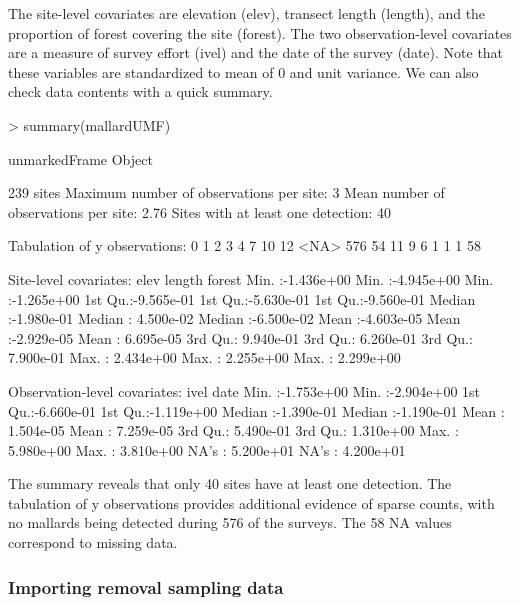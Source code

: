 \documentclass[article,shortnames]{jss}
\begin{document}
The site-level covariates are elevation (elev), transect length (length), 
and the proportion of forest covering the site (forest).  The two 
observation-level covariates are a measure of survey effort (ivel) and the date 
of the survey (date).  Note that these variables are standardized to 
mean of 0 and unit variance.  We can also check data contents with a 
quick summary.

\begin{Schunk}
\begin{Sinput}
> summary(mallardUMF)
\end{Sinput}
\begin{Soutput}
unmarkedFrame Object

239 sites
Maximum number of observations per site: 3 
Mean number of observations per site: 2.76 
Sites with at least one detection: 40 

Tabulation of y observations:
   0    1    2    3    4    7   10   12 <NA> 
 576   54   11    9    6    1    1    1   58 

Site-level covariates:
      elev                length               forest          
 Min.   :-1.436e+00   Min.   :-4.945e+00   Min.   :-1.265e+00  
 1st Qu.:-9.565e-01   1st Qu.:-5.630e-01   1st Qu.:-9.560e-01  
 Median :-1.980e-01   Median : 4.500e-02   Median :-6.500e-02  
 Mean   :-4.603e-05   Mean   :-2.929e-05   Mean   : 6.695e-05  
 3rd Qu.: 9.940e-01   3rd Qu.: 6.260e-01   3rd Qu.: 7.900e-01  
 Max.   : 2.434e+00   Max.   : 2.255e+00   Max.   : 2.299e+00  

Observation-level covariates:
      ivel                 date           
 Min.   :-1.753e+00   Min.   :-2.904e+00  
 1st Qu.:-6.660e-01   1st Qu.:-1.119e+00  
 Median :-1.390e-01   Median :-1.190e-01  
 Mean   : 1.504e-05   Mean   : 7.259e-05  
 3rd Qu.: 5.490e-01   3rd Qu.: 1.310e+00  
 Max.   : 5.980e+00   Max.   : 3.810e+00  
 NA's   : 5.200e+01   NA's   : 4.200e+01  
\end{Soutput}
\end{Schunk}

The summary reveals that only 40 sites have at least one detection. The 
tabulation of y observations provides additional evidence of sparse counts, 
with no mallards being detected during 576 of the surveys. The 58 NA values 
correspond to missing data. 


\subsubsection{Importing removal sampling data}
\end{document}
